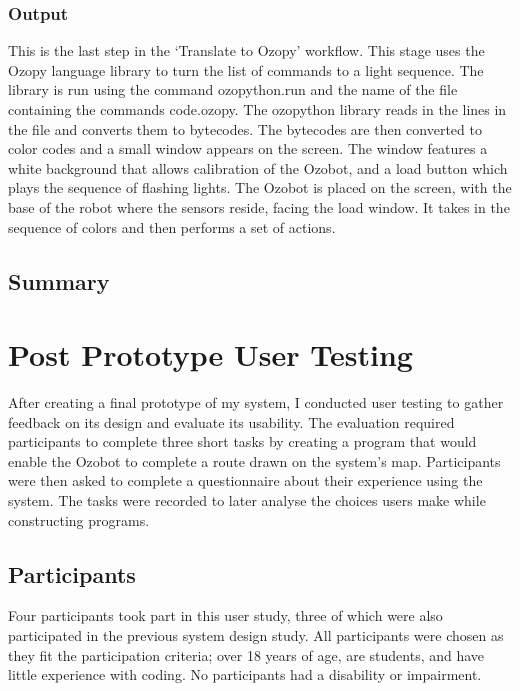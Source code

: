 \documentclass[oneside,%
                    author={Malak Hajji},
                    degree={BSc},
                    title={Designing An Accessible Computational Toolkit For Students},
                  subtitle={With Mixed Visual Abilities}]{dissertation}
\begin{document}
\subsection{Output}  
This is the last step in the ‘Translate to Ozopy’ workflow. This stage uses the Ozopy language library to turn the list of commands to a light sequence. The library is run using the command ozopython.run and the name of the file containing the commands code.ozopy. The ozopython library reads in the lines in the file and converts them to bytecodes. The bytecodes are then converted to color codes and a small window appears on the screen. The window features a white background that allows calibration of the Ozobot, and a load button which plays the sequence of flashing lights. The Ozobot is placed on the screen, with the base of the robot where the sensors reside, facing the load window. It takes in the sequence of colors and then performs a set of actions. 

\section{Summary}









\chapter{Post Prototype User Testing}
\label{chap:testing}

After creating a final prototype of my system, I conducted user testing to gather feedback on its design and evaluate its usability. The evaluation required participants to complete three short tasks by creating a program that would enable the Ozobot to complete a route drawn on the system's map. Participants were then asked to complete a questionnaire about their experience using the system. The tasks were recorded to later analyse the choices users make while constructing programs.

\section{Participants}
Four participants took part in this user study, three of which were also participated in the previous system design study. All participants were chosen as they fit the participation criteria; over 18 years of age, are students, and have little experience with coding. No participants had a disability or impairment.
\end{document}
